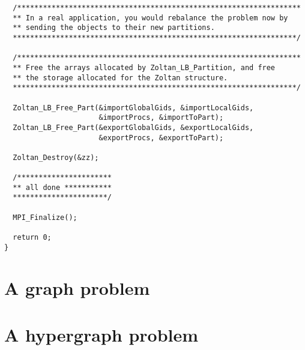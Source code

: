 \begin{verbatim}
  /******************************************************************
  ** In a real application, you would rebalance the problem now by
  ** sending the objects to their new partitions.
  ******************************************************************/

  /******************************************************************
  ** Free the arrays allocated by Zoltan_LB_Partition, and free
  ** the storage allocated for the Zoltan structure.
  ******************************************************************/

  Zoltan_LB_Free_Part(&importGlobalGids, &importLocalGids, 
                      &importProcs, &importToPart);
  Zoltan_LB_Free_Part(&exportGlobalGids, &exportLocalGids, 
                      &exportProcs, &exportToPart);

  Zoltan_Destroy(&zz);

  /**********************
  ** all done ***********
  **********************/

  MPI_Finalize();

  return 0;
}
\end{verbatim}

\clearpage
\section{A graph problem}

\newpage
\section{A hypergraph problem}
